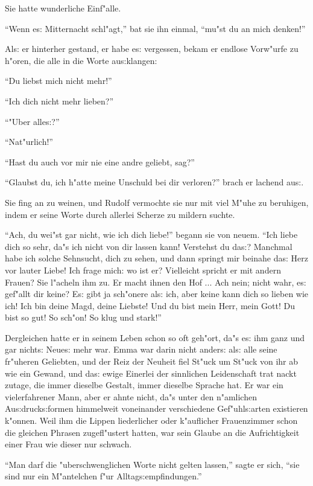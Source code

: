 \documentclass[oneside,12pt]{book}
\newcommand{\s}{s:}%
\begin{document}
Sie hatte wunderliche Einf"alle.

"`Wenn e{\s} Mitternacht schl"agt,"' bat sie ihn einmal, "`mu"st
du an mich denken!"'

Al{\s} er hinterher gestand, er habe e{\s} vergessen, bekam er
endlose Vorw"urfe zu h"oren, die alle in die Worte au{\s}klangen:

"`Du liebst mich nicht mehr!"'

"`Ich dich nicht mehr lieben?"'

"`"Uber alle{\s}?"'

"`Nat"urlich!"'

"`Hast du auch vor mir nie eine andre geliebt, sag?"'

"`Glaubst du, ich h"atte meine Unschuld bei dir verloren?"' brach
er lachend au{\s}.

Sie fing an zu weinen, und Rudolf vermochte sie nur mit viel M"uhe
zu beruhigen, indem er seine Worte durch allerlei Scherze zu
mildern suchte.

"`Ach, du wei"st gar nicht, wie ich dich liebe!"' begann sie von
neuem. "`Ich liebe dich so sehr, da"s ich nicht von dir lassen
kann! Verstehst du da{\s}? Manchmal habe ich solche Sehnsucht,
dich zu sehen, und dann springt mir beinahe da{\s} Herz vor lauter
Liebe! Ich frage mich: wo ist er? Vielleicht spricht er mit andern
Frauen? Sie l"acheln ihm zu. Er macht ihnen den Hof ... Ach nein;
nicht wahr, e{\s} gef"allt dir keine? E{\s} gibt ja sch"onere
al{\s} ich, aber keine kann dich so lieben wie ich! Ich bin deine
Magd, deine Liebste! Und du bist mein Herr, mein Gott! Du bist so
gut! So sch"on! So klug und stark!"'

Dergleichen hatte er in seinem Leben schon so oft geh"ort, da"s
e{\s} ihm ganz und gar nicht{\s} Neue{\s} mehr war. Emma war darin
nicht ander{\s} al{\s} alle seine fr"uheren Geliebten, und der
Reiz der Neuheit fiel St"uck um St"uck von ihr ab wie ein Gewand,
und da{\s} ewige Einerlei der sinnlichen Leidenschaft trat nackt
zutage, die immer dieselbe Gestalt, immer dieselbe Sprache hat. Er
war ein vielerfahrener Mann, aber er ahnte nicht, da"s unter den
n"amlichen Au{\s}druck{\s}formen himmelweit voneinander
verschiedene Gef"uhl{\s}arten existieren k"onnen. Weil ihm die
Lippen liederlicher oder k"auflicher Frauenzimmer schon die
gleichen Phrasen zugefl"ustert hatten, war sein Glaube an die
Aufrichtigkeit einer Frau wie dieser nur schwach.

"`Man darf die "uberschwenglichen Worte nicht gelten lassen,"'
sagte er sich, "`sie sind nur ein M"antelchen f"ur
Alltag{\s}empfindungen."'
\end{document}
